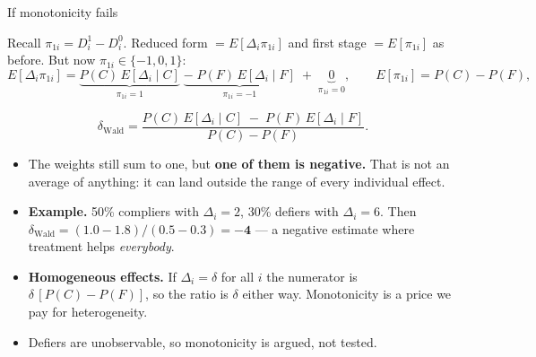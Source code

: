 \documentclass[
  11pt,
  ignorenonframetext,
  aspectratio=169,
]{beamer}
\providecommand{\tightlist}{%
  \setlength{\itemsep}{0pt}\setlength{\parskip}{0pt}}
\begin{document}
\begin{frame}{If monotonicity fails}
\protect{}\label{if-monotonicity-fails}
\small

Recall \(\pi_{1i} = D^1_i - D^0_i\). Reduced form
\(= E[\Delta_i \pi_{1i}]\) and first stage \(= E[\pi_{1i}]\) as before.
But now \(\pi_{1i} \in \{-1,0,1\}\): \[
E[\Delta_i \pi_{1i}] = \underbrace{P(C)\,E[\Delta_i \mid C]}_{\pi_{1i} = 1} \;\underbrace{-\; P(F)\,E[\Delta_i \mid F]}_{\pi_{1i} = -1} \;+\; \underbrace{0}_{\pi_{1i} = 0},
\qquad
E[\pi_{1i}] = P(C) - P(F),
\]

\vspace{-0.6em}

\[
\delta_{\text{Wald}}
= \frac{P(C)\,E[\Delta_i \mid C] \;-\; P(F)\,E[\Delta_i \mid F]}{P(C) - P(F)} .
\]

\begin{itemize}
\tightlist
\item
  The weights still sum to one, but \textbf{one of them is negative.}
  That is not an average of anything: it can land outside the range of
  every individual effect.
\item
  \textbf{Example.} 50\% compliers with \(\Delta_i = 2\), 30\% defiers
  with \(\Delta_i = 6\). Then
  \(\delta_{\text{Wald}} = (1.0 - 1.8)/(0.5 - 0.3) = \mathbf{-4}\) --- a
  negative estimate where treatment helps \emph{everybody}.
\item
  \textbf{Homogeneous effects.} If \(\Delta_i = \delta\) for all \(i\)
  the numerator is \(\delta\,[P(C)-P(F)]\), so the ratio is \(\delta\)
  either way. Monotonicity is a price we pay for heterogeneity.
\item
  Defiers are unobservable, so monotonicity is argued, not tested.
\end{itemize}
\end{frame}
\end{document}
